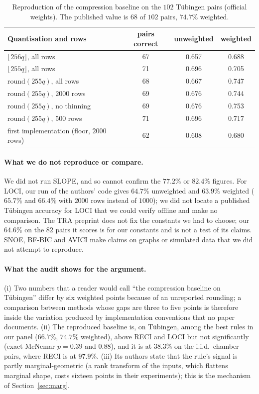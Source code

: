 \begin{table}[t]
\caption{Reproduction of the compression baseline on the $102$ T\"ubingen pairs (official weights). The published value is $68$ of $102$ pairs, $74.7\%$ weighted.}
\label{tab:audit}
\small
\begin{tabular}{@{}lccc@{}}
\toprule
Quantisation and rows & pairs correct & unweighted & weighted\\
\midrule
$\lfloor 256q\rfloor$, all rows & 67 & 0.657 & 0.688\\
$\lfloor 255q\rfloor$, all rows & 71 & 0.696 & 0.705\\
$\mathrm{round}(255q)$, all rows & 68 & 0.667 & 0.747\\
$\mathrm{round}(255q)$, $2000$ rows & 69 & 0.676 & 0.744\\
$\mathrm{round}(255q)$, no thinning & 69 & 0.676 & 0.753\\
$\mathrm{round}(255q)$, $500$ rows & 71 & 0.696 & 0.717\\
first implementation (floor, $2000$ rows) & 62 & 0.608 & 0.680\\
\bottomrule
\end{tabular}
\end{table}

\paragraph{What we do not reproduce or compare.} We did not run SLOPE, and so cannot confirm the $77.2\%$ or $82.4\%$ figures. For LOCI, our run of the authors' code gives $64.7\%$ unweighted and $63.9\%$ weighted ($65.7\%$ and $66.4\%$ with $2000$ rows instead of $1000$); we did not locate a published T\"ubingen accuracy for LOCI that we could verify offline and make no comparison. The TRA preprint does not fix the constants we had to choose; our $64.6\%$ on the $82$ pairs it scores is for our constants and is not a test of its claims. SNOE, BF-BIC and AVICI make claims on graphs or simulated data that we did not attempt to reproduce.

\paragraph{What the audit shows for the argument.} (i) Two numbers that a reader would call ``the compression baseline on T\"ubingen'' differ by six weighted points because of an unreported rounding; a comparison between methods whose gaps are three to five points is therefore inside the variation produced by implementation conventions that no paper documents. (ii) The reproduced baseline is, on T\"ubingen, among the best rules in our panel ($66.7\%$, $74.7\%$ weighted), above RECI and LOCI but not significantly (exact McNemar $p=0.39$ and $0.88$), and it is at $38.3\%$ on the i.i.d.\ chamber pairs, where RECI is at $97.9\%$. (iii) Its authors state that the rule's signal is partly marginal-geometric (a rank transform of the inputs, which flattens marginal shape, costs sixteen points in their experiments); this is the mechanism of Section~\ref{sec:marg}.


